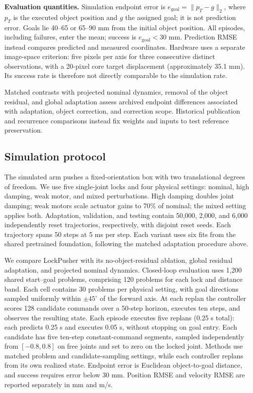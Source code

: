 \documentclass[conference]{IEEEtran}
\begin{document}
\textbf{Evaluation quantities.} Simulation endpoint error is $e_{\mathrm{goal}}=\|p_T-g\|_2$, where $p_T$ is the executed object position and $g$ the assigned goal; it is not prediction error. Goals lie 40--65 or 65--90 mm from the initial object position. All episodes, including failures, enter the mean; success is $e_{\mathrm{goal}}<30$ mm. Prediction RMSE instead compares predicted and measured coordinates. Hardware uses a separate image-space criterion: five pixels per axis for three consecutive distinct observations, with a 20-pixel core target displacement (approximately 35.1 mm). Its success rate is therefore not directly comparable to the simulation rate.

Matched contrasts with projected nominal dynamics, removal of the object residual, and global adaptation assess archived endpoint differences associated with adaptation, object correction, and correction scope. Historical publication and recurrence comparisons instead fix weights and inputs to test reference preservation.

\subsection{Simulation protocol}
The simulated arm pushes a fixed-orientation box with two translational degrees of freedom. We use five single-joint locks and four physical settings: nominal, high damping, weak motor, and mixed perturbations. High damping doubles joint damping; weak motors scale actuator gains to 70\% of nominal; the mixed setting applies both. Adaptation, validation, and testing contain 50,000, 2,000, and 6,000 independently reset trajectories, respectively, with disjoint reset seeds. Each trajectory spans 50 steps at 5 ms per step. Each variant uses six fits from the shared pretrained foundation, following the matched adaptation procedure above.

We compare LockPusher with its no-object-residual ablation, global residual adaptation, and projected nominal dynamics. Closed-loop evaluation uses 1,200 shared start--goal problems, comprising 120 problems for each lock and distance band. Each cell contains 30 problems per physical setting, with goal directions sampled uniformly within $\pm45^\circ$ of the forward axis. At each replan the controller scores 128 candidate commands over a 50-step horizon, executes ten steps, and observes the resulting state. Each episode executes five replans (0.25 s total): each predicts 0.25 s and executes 0.05 s, without stopping on goal entry. Each candidate has five ten-step constant-command segments, sampled independently from $[-0.8,0.8]$ on free joints and set to zero on the locked joint. Methods use matched problem and candidate-sampling settings, while each controller replans from its own realized state. Endpoint error is Euclidean object-to-goal distance, and success requires error below 30 mm. Position RMSE and velocity RMSE are reported separately in mm and m/s.
\end{document}
